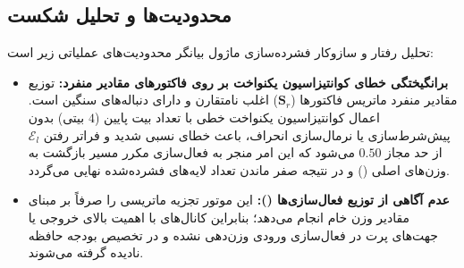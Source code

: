 \subsection{محدودیت‌ها و تحلیل شکست}
تحلیل رفتار و سازوکار فشرده‌سازی ماژول  بیانگر محدودیت‌های عملیاتی زیر است:
\begin{itemize}
    \item \textbf{برانگیختگی خطای کوانتیزاسیون یکنواخت بر روی فاکتورهای مقادیر منفرد:} توزیع مقادیر منفرد ماتریس فاکتورها ($\mathbf{S}_r$) اغلب نامتقارن و دارای دنباله‌های سنگین است. اعمال کوانتیزاسیون یکنواخت خطی با تعداد بیت پایین ($4$ بیتی) بدون پیش‌شرط‌سازی یا نرمال‌سازی انحراف، باعث خطای نسبی شدید و فراتر رفتن $\mathcal{E}_l$ از حد مجاز $0.50$ می‌شود که این امر منجر به فعال‌سازی مکرر مسیر بازگشت به وزن‌های اصلی () و در نتیجه صفر ماندن تعداد لایه‌های فشرده‌شده نهایی می‌گردد.
    \item \textbf{عدم آگاهی از توزیع فعال‌سازی‌ها ():} این موتور تجزیه ماتریسی را صرفاً بر مبنای مقادیر وزن خام انجام می‌دهد؛ بنابراین کانال‌های با اهمیت بالای خروجی یا جهت‌های پرت در فعال‌سازی ورودی وزن‌دهی نشده و در تخصیص بودجه حافظه نادیده گرفته می‌شوند.
\end{itemize}
